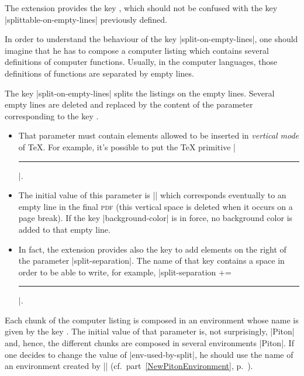 \documentclass{article}
\begin{document}
\label{split-on-empty-lines}

The extension  provides the key ,
which should not be confused with the key |splittable-on-empty-lines|
previously defined.

\smallskip
In order to understand the behaviour of the key |split-on-empty-lines|, one
should imagine that he has to compose a computer listing which contains
several definitions of computer functions. Usually, in the computer
languages, those definitions of functions are separated by empty lines.

\smallskip
The key |split-on-empty-lines| splits the listings on the empty lines. Several
empty lines are deleted and replaced by the content of the parameter
corresponding to the key .
\begin{itemize}
\item That parameter must contain elements allowed to be inserted in
\emph{vertical mode} of TeX. For example, it's possible to put the TeX
primitive |\hrule|.

\item The initial value of this parameter is
|\vspace{\baselineskip}\vspace{-1.25pt}| which corresponds eventually to an 
empty line in the final \textsc{pdf} (this vertical space is deleted when it
occurs on a page break). If the key |background-color| is in force, no
background color is added to that empty line.

\item In fact, the extension  provides also the key
 to add elements on the right of the parameter
|split-separation|. The name of that key contains a space in order to be able
to write, for example, |split-separation += \hrule|.
\end{itemize}


Each chunk of the computer listing is composed in an environment whose name
is given by the key . The initial value of that
parameter is, not surprisingly, |Piton| and, hence, the different chunks are
composed in several environments |{Piton}|. If one decides to change the value
of |env-used-by-split|, he should use the name of an environment created by
|\NewPitonEnvironment| (cf.~part~\ref{NewPitonEnvironment},
p.~\pageref{NewPitonEnvironment}).
\end{document}
